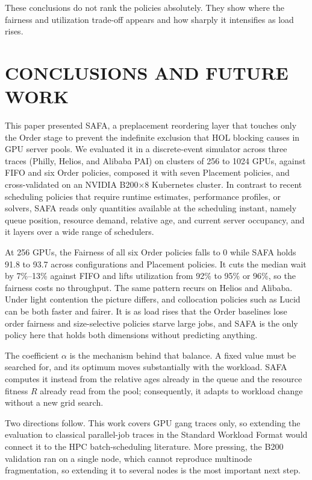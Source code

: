 \documentclass{ieeetj}
\begin{document}
These conclusions do not rank the policies absolutely. They show where the fairness and utilization trade-off appears and how sharply it intensifies as load rises.

\FloatBarrier

\section{CONCLUSIONS AND FUTURE WORK}\label{conclu}

This paper presented SAFA, a preplacement reordering layer that touches only the Order stage to prevent the indefinite exclusion that HOL blocking causes in GPU server pools. We evaluated it in a discrete-event simulator across three traces (Philly, Helios, and Alibaba PAI) on clusters of 256 to 1024 GPUs, against FIFO and six Order policies, composed it with seven Placement policies, and cross-validated on an NVIDIA B200$\times$8 Kubernetes cluster. In contrast to recent scheduling policies that require runtime estimates, performance profiles, or solvers, SAFA reads only quantities available at the scheduling instant, namely queue position, resource demand, relative age, and current server occupancy, and it layers over a wide range of schedulers.

At 256 GPUs, the Fairness of all six Order policies falls to 0 while SAFA holds 91.8 to 93.7 across configurations and Placement policies. It cuts the median wait by 7\%--13\% against FIFO and lifts utilization from 92\% to 95\% or 96\%, so the fairness costs no throughput. The same pattern recurs on Helios and Alibaba. Under light contention the picture differs, and collocation policies such as Lucid can be both faster and fairer. It is as load rises that the Order baselines lose order fairness and size-selective policies starve large jobs, and SAFA is the only policy here that holds both dimensions without predicting anything.

The coefficient $\alpha$ is the mechanism behind that balance. A fixed value must be searched for, and its optimum moves substantially with the workload. SAFA computes it instead from the relative ages already in the queue and the resource fitness $R$ already read from the pool; consequently, it adapts to workload change without a new grid search.

Two directions follow. This work covers GPU gang traces only, so extending the evaluation to classical parallel-job traces in the Standard Workload Format would connect it to the HPC batch-scheduling literature. More pressing, the B200 validation ran on a single node, which cannot reproduce multinode fragmentation, so extending it to several nodes is the most important next step.
\end{document}
